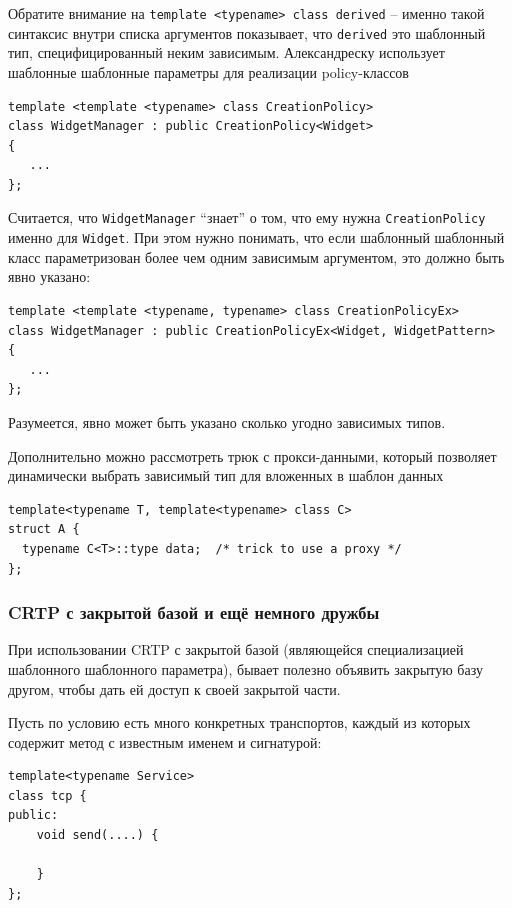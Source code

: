 \documentclass[a4paper,12pt,oneside]{article}
\begin{document}
Обратите внимание на \lstinline!template <typename> class derived! -- именно такой синтаксис внутри списка аргументов показывает, что \lstinline!derived! это шаблонный тип, специфицированный неким зависимым. Александреску\cite{mcpp} использует шаблонные шаблонные параметры для реализации policy-классов

\begin{lstlisting}
template <template <typename> class CreationPolicy>
class WidgetManager : public CreationPolicy<Widget>
{
   ...
};
\end{lstlisting}

Считается, что \lstinline!WidgetManager! ``знает'' о том, что ему нужна \lstinline!CreationPolicy! именно для \lstinline!Widget!. При этом нужно понимать, что если шаблонный шаблонный класс параметризован более чем одним зависимым аргументом, это должно быть явно указано:

\begin{lstlisting}
template <template <typename, typename> class CreationPolicyEx>
class WidgetManager : public CreationPolicyEx<Widget, WidgetPattern>
{
   ...
};
\end{lstlisting}

Разумеется, явно может быть указано сколько угодно зависимых типов.

Дополнительно можно рассмотреть трюк с прокси-данными, который позволяет динамически выбрать зависимый тип для вложенных в шаблон данных

\begin{lstlisting}
template<typename T, template<typename> class C>
struct A {
  typename C<T>::type data;  /* trick to use a proxy */
};
\end{lstlisting}

\subsubsection{CRTP с закрытой базой и ещё немного дружбы}\label{ClosedCRTP}

При использовании CRTP с закрытой базой (являющейся специализацией шаблонного шаблонного параметра), бывает полезно объявить закрытую базу другом, чтобы дать ей доступ к своей закрытой части.

Пусть по условию есть много конкретных транспортов, каждый из которых содержит метод с известным именем и сигнатурой:

\begin{lstlisting}
template<typename Service>
class tcp {
public:
    void send(....) {

    }
};
\end{lstlisting}
\end{document}
